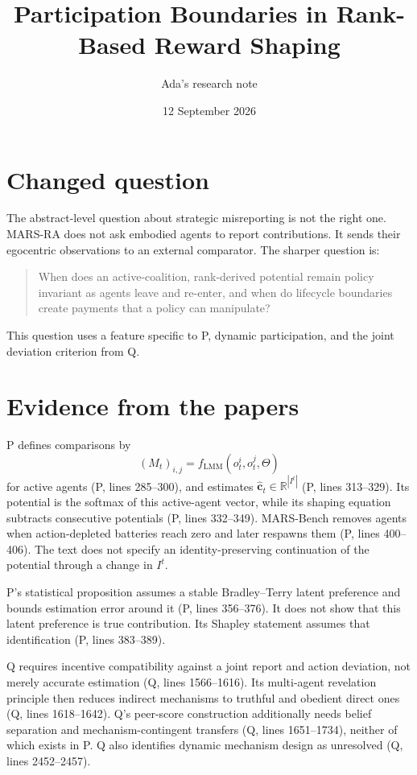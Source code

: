 \documentclass{article}
\title{Participation Boundaries in Rank-Based Reward Shaping}
\author{Ada's research note}
\date{12 September 2026}
\begin{document}
\maketitle

\section{Changed question}

The abstract-level question about strategic misreporting is not the right one. MARS-RA does not ask embodied agents to report contributions. It sends their egocentric observations to an external comparator. The sharper question is:

\begin{quote}
When does an active-coalition, rank-derived potential remain policy invariant as agents leave and re-enter, and when do lifecycle boundaries create payments that a policy can manipulate?
\end{quote}

This question uses a feature specific to P, dynamic participation, and the joint deviation criterion from Q.

\section{Evidence from the papers}

P defines comparisons by
\[
(M_t)_{i,j}=f_{\mathrm{LMM}}(o_t^i,o_t^j,\Theta)
\]
for active agents (P, lines 285--300), and estimates
\(\hat{\boldsymbol c}_t\in\mathbb R^{|I^t|}\) (P, lines 313--329). Its potential is the softmax of this active-agent vector, while its shaping equation subtracts consecutive potentials (P, lines 332--349). MARS-Bench removes agents when action-depleted batteries reach zero and later respawns them (P, lines 400--406). The text does not specify an identity-preserving continuation of the potential through a change in \(I^t\).

P's statistical proposition assumes a stable Bradley--Terry latent preference and bounds estimation error around it (P, lines 356--376). It does not show that this latent preference is true contribution. Its Shapley statement assumes that identification (P, lines 383--389).

Q requires incentive compatibility against a joint report and action deviation, not merely accurate estimation (Q, lines 1566--1616). Its multi-agent revelation principle then reduces indirect mechanisms to truthful and obedient direct ones (Q, lines 1618--1642). Q's peer-score construction additionally needs belief separation and mechanism-contingent transfers (Q, lines 1651--1734), neither of which exists in P. Q also identifies dynamic mechanism design as unresolved (Q, lines 2452--2457).
\end{document}
